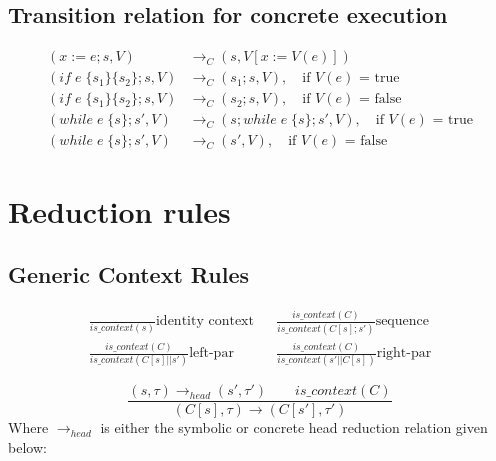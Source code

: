 \documentclass[submission,copyright,creativecommons]{eptcs}
\begin{document}
\subsection{Transition relation for concrete execution}
\begin{align*}
(x := e ; s, V) & \rightarrow_{C} (s, V[x := V(e)])\\
(if \;e\; \{s_{1}\} \{s_{2}\} ; s, V) & \rightarrow_{C} (s_{1} ; s, V), \quad \mbox{if $V (e)$ = true} \\
(if \;e\; \{s_{1}\} \{s_{2}\} ; s, V) & \rightarrow_{C} (s_{2} ; s, V), \quad \mbox{if $V (e)$ = false} \\
(while \;e\; \{s\} ; s', V) & \rightarrow_{C} (s ; while \;e\; \{s\} ; s', V), \quad \mbox{if $V (e)$ = true} \\
(while \;e\; \{s\} ; s', V) & \rightarrow_{C} (s', V), \quad \mbox{if $V (e)$ = false}
\end{align*}
\section{Reduction rules}
\subsection{Generic Context Rules}
\begin{align*}
  \frac{}{is\_context (s)} \mbox{identity context} && \frac{is\_context (C)}{is\_context (C[s] ; s')} \mbox{sequence} \\
  \frac{is\_context (C)}{is\_context (C[s] |\!| s')} \mbox{left-par}
  && \frac{is\_context (C)}{is\_context (s' |\!| C[s])} \mbox{right-par}
\end{align*}

\[\frac{(s, \tau) \rightarrow_{head} (s', \tau') \qquad is\_context (C)}{(C[s], \tau) \rightarrow (C[s'], \tau')}\]
Where $\rightarrow_{head}$ is either the symbolic or concrete head reduction relation given below:
\end{document}

